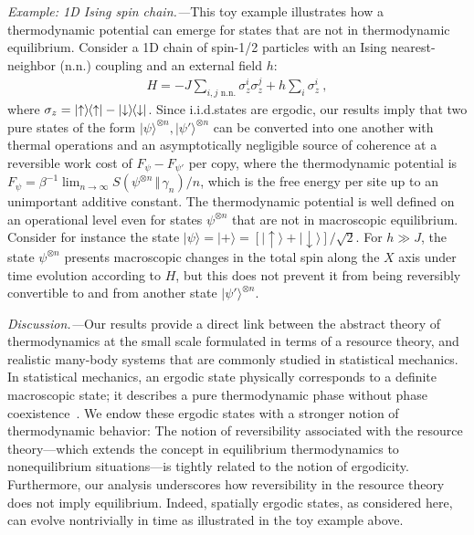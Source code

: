 \documentclass[prl,reprint,longbibliography,superscriptaddress]{revtex4-1}
\renewcommand\paragraph[1]{\par\emph{#1.---}\kern2pt\relax\ignorespaces}
\begin{document}
\paragraph{Example: 1D Ising spin chain}This toy example illustrates how a thermodynamic potential can emerge for states
that are not in thermodynamic equilibrium.
Consider a 1D chain of spin-1/2 particles with an Ising nearest-neighbor
(n.n.\@) coupling and an external field $h$:
\begin{align}
  H = -J\! \sum_{i, j\text{ n.n.}}\! \sigma_z^{i}\sigma_z^{j} + h\sum_i \sigma_z^{i}\ ,
\end{align}
where $\sigma_z = \lvert {\uparrow }\rangle\hspace*{-0.25ex}\langle{\uparrow }\rvert - \lvert {\downarrow}\rangle\hspace*{-0.25ex}\langle{\downarrow}\rvert $.  Since i.i.d.\@ states are
ergodic, our results imply that two pure states of the form
$\lvert {\psi}\rangle ^{\otimes n}, \lvert {\psi'}\rangle ^{\otimes n}$ can be converted into one
another with thermal operations and an asymptotically negligible source of
coherence at a reversible work cost of $F_\psi - F_{\psi'}$ per copy, where the
thermodynamic potential is $F_\psi = \beta^{-1} \lim_{n\to\infty} {S}(\psi^{\otimes n}\,\Vert\,\gamma_n)/n$, which is the free energy per site up to an
unimportant additive constant.  The thermodynamic potential is well defined on
an operational level even for states $\psi^{\otimes n}$ that are not in
macroscopic equilibrium.  Consider for instance the state
$\lvert {\psi}\rangle =\lvert {+}\rangle =[\lvert {\uparrow}\rangle +\lvert {\downarrow}\rangle ]/\sqrt{2}$.  For $h\gg J$, the
state $\psi^{\otimes n}$ presents macroscopic changes in the total spin along
the $X$ axis under time evolution according to $H$, but this does not prevent it
from being reversibly convertible to and from another state
$\lvert {\psi'}\rangle ^{\otimes n}$.


\paragraph{Discussion}Our results provide a direct link between the abstract theory of thermodynamics
at the small scale formulated in terms of a resource theory, and realistic
many-body systems that are commonly studied in statistical mechanics. 
In statistical mechanics, an ergodic state physically corresponds to a definite
macroscopic state; it describes a pure thermodynamic phase without phase
coexistence~\cite{BookRuelle_StatMechRigorous}.
We endow these ergodic states with a stronger notion of thermodynamic behavior:
The notion of reversibility associated with the resource theory---which extends
the concept in equilibrium thermodynamics to nonequilibrium
situations---is tightly related to the notion of ergodicity.
Furthermore, our analysis underscores how reversibility in the resource theory
does not imply equilibrium.  Indeed, spatially ergodic states, as considered here,
can evolve nontrivially in time as illustrated in the toy example
above.
\end{document}

